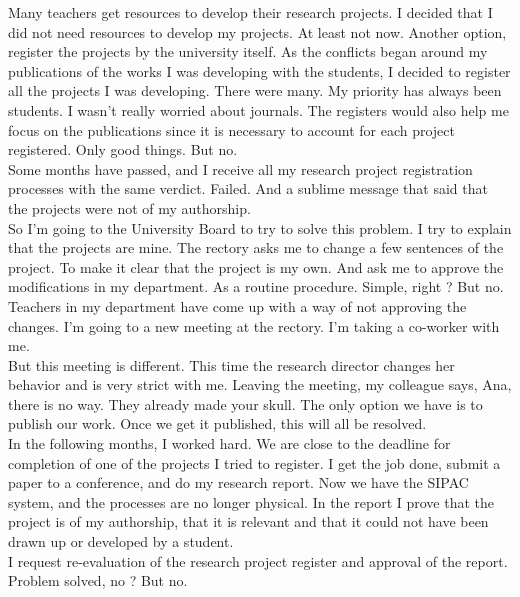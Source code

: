 \documentclass[11pt]{book}
\begin{document}
\noindent Many teachers get resources to develop their research projects. I decided that I did not need resources to develop my projects. At least not now. Another option, register the projects by the university itself. As the conflicts began around my publications of the works I was developing with the students, I decided to register all the projects I was developing. There were many. My priority has always been students. I wasn't really worried about journals. The registers would also help me focus on the publications since it is necessary to account for each project registered. Only good things. But no. \\

\noindent Some months have passed, and I receive all my research project registration processes with the same verdict. Failed. And a sublime message that said that the projects were not of my authorship. \\

\noindent So I'm going to the University Board to try to solve this problem. I try to explain that the projects are mine. The rectory asks me to change a few sentences of the project. To make it clear that the project is my own. And ask me to approve the modifications in my department. As a routine procedure. Simple, right ? But no. \\

\noindent Teachers in my department have come up with a way of not approving the changes. I'm going to a new meeting at the rectory. I'm taking a co-worker with me. \\

\noindent But this meeting is different. This time the research director changes her behavior and is very strict with me. Leaving the meeting, my colleague says, Ana, there is no way. They already made your skull. The only option we have is to publish our work. Once we get it published, this will all be resolved. \\

\noindent In the following months, I worked hard. We are close to the deadline for completion of one of the projects I tried to register. I get the job done, submit a paper to a conference, and do my research report. Now we have the SIPAC system, and the processes are no longer physical. In the report I prove that the project is of my authorship, that it is relevant and that it could not have been drawn up or developed by a student. \\

\noindent I request re-evaluation of the research project register and approval of the report. Problem solved, no ? But no. \\
\end{document}
